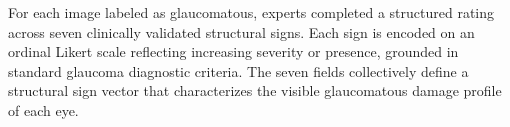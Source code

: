 \documentclass[runningheads]{llncs}
\begin{document}
For each image labeled as glaucomatous, experts completed a structured rating across seven clinically validated structural signs. Each sign is encoded on an ordinal Likert scale reflecting increasing severity or presence, grounded in standard glaucoma diagnostic criteria. The seven fields collectively define a structural sign vector that characterizes the visible glaucomatous damage profile of each eye.

\end{document}
